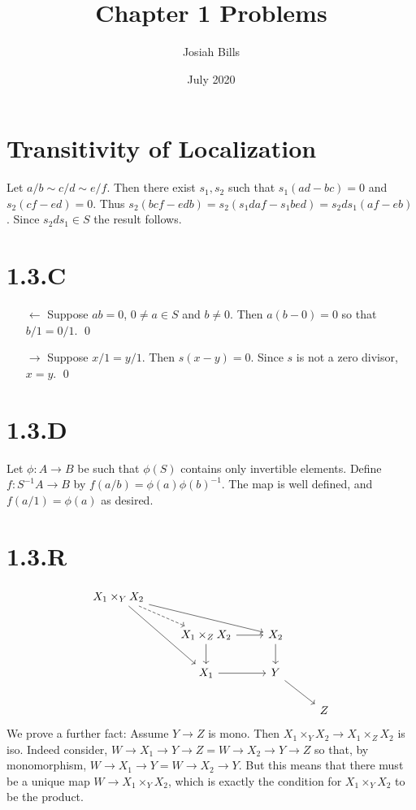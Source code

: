 \documentclass{article}
\title{Chapter 1 Problems}
\author{Josiah Bills}
\date{July 2020}
\begin{document}
\maketitle

\section{Transitivity of Localization}
Let $a/b \sim c/d \sim e/f$. Then there exist $s_1, s_2$ such that
$s_1(ad-bc)=0$ and $s_2(cf-ed)=0$. Thus $s_2(bcf-edb)=s_2(s_1daf-s_1bed)=s_2ds_1(af-eb)$.
Since $s_2ds_1 \in S$ the result follows.

\section{1.3.C}
\begin{itemize}
    \item[$\leftarrow$] Suppose $ab=0$, $0 \not = a \in S$
          and $b \not = 0$. Then $a(b-0)=0$ so that
          $b/1=0/1$. \qed
    \item[$\rightarrow$] Suppose $x/1=y/1$. Then
          $s(x-y)=0$. Since $s$ is not a zero divisor,
          $x=y$. \qed
\end{itemize}

\section{1.3.D}
Let $\phi: A \to B$ be such that $\phi(S)$ contains only
invertible elements. Define $f : S^{-1}A \to B$ by $f(a/b)=\phi(a)\phi(b)^{-1}$.
The map is well defined, and $f(a/1)=\phi(a)$ as desired.

\section{1.3.R}
\[\begin{tikzcd}
        {X_1\times_YX_2}                \\
         & {X_1\times_ZX_2} & {X_2}     \\
         & {X_1}            & Y         \\
         &                  &       & Z
        \arrow[from=3-2, to=3-3]
        \arrow[from=2-3, to=3-3]
        \arrow[from=3-3, to=4-4]
        \arrow[from=2-2, to=3-2]
        \arrow[from=2-2, to=2-3]
        \arrow[from=1-1, to=3-2]
        \arrow[from=1-1, to=2-3]
        \arrow[dashed, from=1-1, to=2-2]
    \end{tikzcd}\]
We prove a further fact: Assume $Y \to Z$ is mono. Then
$X_1\times_YX_2 \to X_1\times_ZX_2$ is iso. Indeed consider, $W \to X_1 \to Y \to Z = W \to X_2 \to Y \to Z$ so that,
by monomorphism, $W \to X_1 \to Y = W \to X_2 \to Y$. But this means that there must be a
unique map $W \to X_1 \times_Y X_2$, which is exactly the condition for
$X_1 \times_Y X_2$ to be the product.
\end{document}
